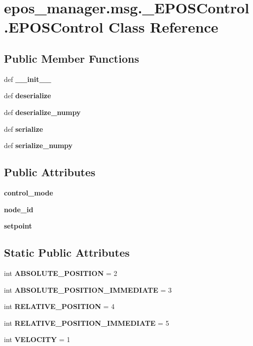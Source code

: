 \section{epos\-\_\-manager.\-msg.\-\_\-\-E\-P\-O\-S\-Control.\-E\-P\-O\-S\-Control \-Class \-Reference}
\label{classepos__manager_1_1msg_1_1__EPOSControl_1_1EPOSControl}
\subsection*{\-Public \-Member \-Functions}
\begin{DoxyCompactItemize}
\item 
def {\bf \-\_\-\-\_\-init\-\_\-\-\_\-}
\item 
def {\bf deserialize}
\item 
def {\bf deserialize\-\_\-numpy}
\item 
def {\bf serialize}
\item 
def {\bf serialize\-\_\-numpy}
\end{DoxyCompactItemize}
\subsection*{\-Public \-Attributes}
\begin{DoxyCompactItemize}
\item 
{\bf control\-\_\-mode}
\item 
{\bf node\-\_\-id}
\item 
{\bf setpoint}
\end{DoxyCompactItemize}
\subsection*{\-Static \-Public \-Attributes}
\begin{DoxyCompactItemize}
\item 
int {\bf \-A\-B\-S\-O\-L\-U\-T\-E\-\_\-\-P\-O\-S\-I\-T\-I\-O\-N} = 2
\item 
int {\bf \-A\-B\-S\-O\-L\-U\-T\-E\-\_\-\-P\-O\-S\-I\-T\-I\-O\-N\-\_\-\-I\-M\-M\-E\-D\-I\-A\-T\-E} = 3
\item 
int {\bf \-R\-E\-L\-A\-T\-I\-V\-E\-\_\-\-P\-O\-S\-I\-T\-I\-O\-N} = 4
\item 
int {\bf \-R\-E\-L\-A\-T\-I\-V\-E\-\_\-\-P\-O\-S\-I\-T\-I\-O\-N\-\_\-\-I\-M\-M\-E\-D\-I\-A\-T\-E} = 5
\item 
int {\bf \-V\-E\-L\-O\-C\-I\-T\-Y} = 1
\end{DoxyCompactItemize}
